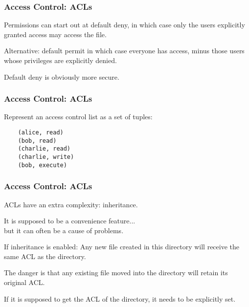 \begin{frame}
\frametitle{Access Control: ACLs}


Permissions can start out at \alert{default deny}, in which case only the users explicitly granted access may access the file.

Alternative: \alert{default permit} in which case everyone has access, minus those users whose privileges are explicitly denied. 

Default deny is obviously more secure.


\end{frame}

\begin{frame}[fragile]
\frametitle{Access Control: ACLs}


Represent an access control list as a set of tuples:
\begin{verbatim}
	(alice, read)
	(bob, read)
	(charlie, read)
	(charlie, write)
	(bob, execute)
\end{verbatim}


\end{frame}

\begin{frame}
\frametitle{Access Control: ACLs}


ACLs have an extra complexity: inheritance.

It is supposed to be a convenience feature...\\
\quad but it can often be a cause of problems.

If inheritance is enabled: 
Any new file created in this directory will receive the same ACL as the directory.

The danger is that any existing file moved into the directory will retain its original ACL. 

If it is supposed to get the ACL of the directory, it needs to be explicitly set.


\end{frame}




